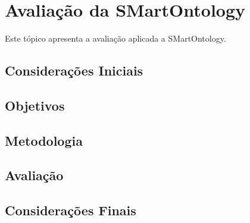 \chapter{Avaliação da SMartOntology}
\label{sec:avaliacao_da_smartontology}

Este tópico apresenta a avaliação aplicada a SMartOntology.

\section{Considerações Iniciais}
\label{sec:concidaracoes_iniciais}


\section{Objetivos}
\label{sec:objetivos}


\section{Metodologia}
\label{sec:metodologia}


\section{Avaliação}
\label{sec:avaliacao}


\section{Considerações Finais}
\label{sec:concidaracoes_finais}